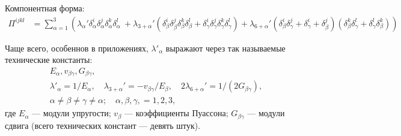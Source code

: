 Компонентная форма:
\begin{align}
	\Pi^{ijkl} &= \sum_{\alpha = 1}^{3} \left(\lambda_\alpha' \delta^i_\alpha \delta^j_\alpha \delta^k_\alpha \delta^l_\alpha\ + \lambda_{3+\alpha}' \left(\delta^i_\beta\delta^j_\beta\delta^k_\beta\delta^l_\beta + \delta^i_\gamma\delta^j_\gamma\delta^k_\gamma\delta^l_\gamma\right) + \lambda_{6 + \alpha}' \left(\delta^i_\beta \delta^j_\gamma + \delta^i_\gamma + \delta^j_\beta\right)\left(\delta^k_\beta\delta^l_\gamma + \delta^l_\gamma\delta^k_\beta\right)\right)
\end{align}

Чаще всего, особеннов в приложениях, $\lambda'_{\alpha}$ выражают через так называемые технические константы:
\begin{gather}
	E_{\alpha}, v_{\beta\gamma}, G_{\beta\gamma}, \\
	\lambda'_{\alpha} = 1 / E_{\alpha}, \quad \lambda_{3 + \alpha}' = - v_{\beta \gamma} / E_{\beta}, \quad 2 \lambda_{6 + \alpha}' = 1 / \left(2 G_{\beta \gamma}\right), \\
	\alpha \not = \beta \not = \gamma \not = \alpha; \quad \alpha, \beta, \gamma, = 1, 2, 3, \nonumber
\end{gather}
где $E_{\alpha}$ --- модули упругости; $v_{\beta}$ --- коэффициенты Пуассона; $G_{\beta \gamma}$ --- модули сдвига (всего технических констант --- девять штук). 

